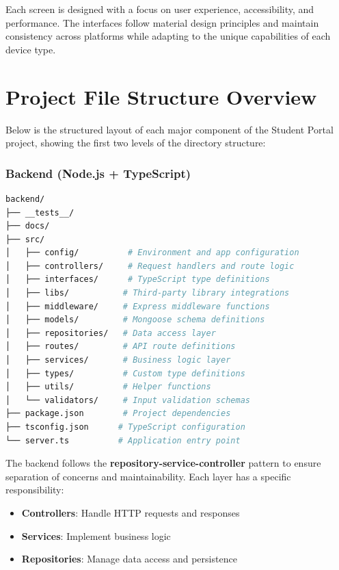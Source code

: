 Each screen is designed with a focus on user experience, accessibility, and performance. The interfaces follow material design principles and maintain consistency across platforms while adapting to the unique capabilities of each device type.

\section{Project File Structure Overview}
\label{subsec:file_structure}

Below is the structured layout of each major component of the Student Portal project, showing the first two levels of the directory structure:

\subsubsection{Backend (Node.js + TypeScript)}

\begin{lstlisting}[language=bash, caption={Backend Directory Structure (tree -L 2)}]
backend/
├── __tests__/
├── docs/
├── src/
│   ├── config/          # Environment and app configuration
│   ├── controllers/     # Request handlers and route logic
│   ├── interfaces/      # TypeScript type definitions
│   ├── libs/           # Third-party library integrations
│   ├── middleware/     # Express middleware functions
│   ├── models/         # Mongoose schema definitions
│   ├── repositories/   # Data access layer
│   ├── routes/         # API route definitions
│   ├── services/       # Business logic layer
│   ├── types/          # Custom type definitions
│   ├── utils/          # Helper functions
│   └── validators/     # Input validation schemas
├── package.json        # Project dependencies
├── tsconfig.json      # TypeScript configuration
└── server.ts          # Application entry point
\end{lstlisting}

\begin{tcolorbox}[title=Backend Architecture]
The backend follows the \textbf{repository-service-controller} pattern to ensure separation of concerns and maintainability. Each layer has a specific responsibility:
\begin{itemize}
    \item \textbf{Controllers}: Handle HTTP requests and responses
    \item \textbf{Services}: Implement business logic
    \item \textbf{Repositories}: Manage data access and persistence
\end{itemize}
\end{tcolorbox}

